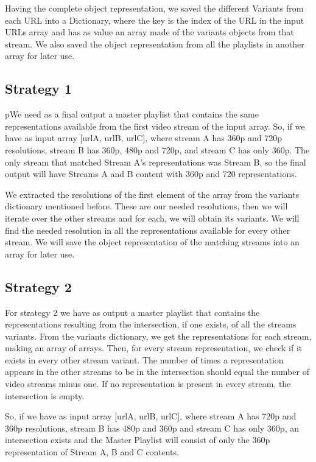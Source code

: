 Having the complete object representation, we saved the different Variants from each URL into a Dictionary, where the key is the index of the URL in the input URLs array and has as value an array made of the variants objects from that stream. We also saved the object representation from all the playlists in another array for later use.

\subsection{Strategy 1}

pWe need as a final output a master playlist that contains the same representations available from the first video stream of the input array. So, if we have as input array [urlA, urlB, urlC], where stream A has 360p  and 720p resolutions, stream B has 360p, 480p and 720p, and stream C has only 360p. The only stream that matched Stream A's representations was Stream B, so the final output will have Streams A and B content with 360p and 720 representations. 

We extracted the resolutions of the first element of the array from the variants dictionary mentioned before. These are our needed resolutions, then we will iterate over the other streams and for each, we will obtain its variants. We will find the needed resolution in all the representations available for every other stream. We will save the object representation of the matching streams into an array for later use.

\subsection{Strategy 2}

For strategy 2 we have as output a master playlist that contains the representations resulting from the intersection, if one exists, of all the streams variants. From the variants dictionary, we get the representations for each stream, making an array of arrays. Then, for every stream representation, we check if it exists in every other stream variant. The number of times a representation appears in the other streams to be in the intersection should equal the number of video streams minus one. If no representation is present in every stream, the intersection is empty.

So, if we have as input array [urlA, urlB, urlC], where stream A has 720p and 360p resolutions, stream B has 480p and 360p and stream C has only 360p, an intersection exists and the Master Playlist will consist of only the 360p representation of Stream A, B and C contents.

